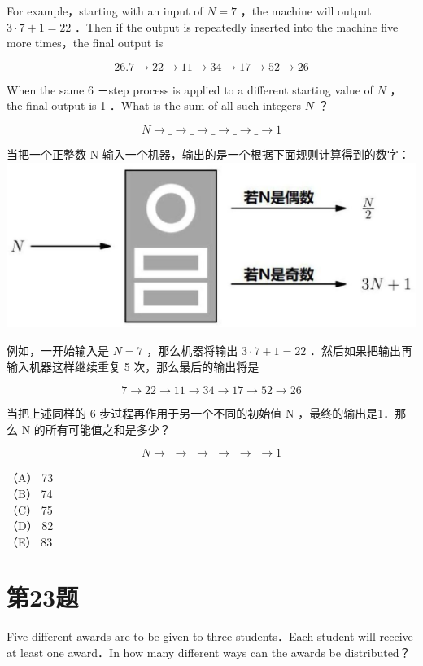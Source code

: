 \documentclass[10pt]{article}
\begin{document}
For example，starting with an input of $N=7$ ，the machine will output $3 \cdot 7+1=22$ ．Then if the output is repeatedly inserted into the machine five more times，the final output is

$$
26.7 \rightarrow 22 \rightarrow 11 \rightarrow 34 \rightarrow 17 \rightarrow 52 \rightarrow 26
$$

When the same 6 －step process is applied to a different starting value of $N$ ，the final output is 1 ．What is the sum of all such integers $N$ ？

$$
N \rightarrow \_\rightarrow \_\rightarrow \_\rightarrow \_\rightarrow \_\rightarrow 1
$$

当把一个正整数 N 输入一个机器，输出的是一个根据下面规则计算得到的数字：\\
\includegraphics[max width=\textwidth, center]{2025_09_05_48544237b06df716137eg-13(1)}

例如，一开始输入是 $N=7$ ，那么机器将输出 $3 \cdot 7+1=22$ ．然后如果把输出再输入机器这样继续重复 5 次，那么最后的输出将是

$$
7 \rightarrow 22 \rightarrow 11 \rightarrow 34 \rightarrow 17 \rightarrow 52 \rightarrow 26
$$

当把上述同样的 6 步过程再作用于另一个不同的初始值 N ，最终的输出是1．那么 N 的所有可能值之和是多少？

$$
N \rightarrow \_\rightarrow \_\rightarrow \_\rightarrow \_\rightarrow \_\rightarrow 1
$$

（A） 73\\
（B） 74\\
（C） 75\\
（D） 82\\
（E） 83

\section*{第23题}
Five different awards are to be given to three students．Each student will receive at least one award．In how many different ways can the awards be distributed？
\end{document}
